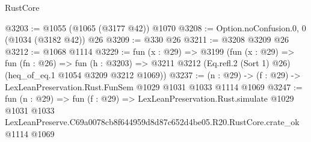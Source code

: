 \begin{lexlean}{RustCore}
\begin{coremodule}
@3203 := @1055 (@1065 (@3177 @42)) @1070
@3208 := Option.noConfusion.{0, 0} (@1034 (@3182 @42)) @26
@3209 := @330 @26
@3211 := @3208 @3209 @26
@3212 := @1068 @1114
@3229 := fun (x : @29) =>
  @3199
    (fun (x : @29) =>
    fun (fn : @26) =>
    fun (h : @3203) =>
    @3211 @3212 (Eq.refl.{2} (Sort 1) @26) (heq_of_eq.{1} @1054 @3209 @3212 @1069))
@3237 := (n : @29) -> (f : @29) -> LexLeanPreservation.Rust.FunSem @1029 @1031 @1033 @1114 @1069
@3247 := fun (n : @29) =>
  fun (f : @29) =>
  LexLeanPreservation.Rust.simulate
    @1029
    @1031
    @1033
    LexLeanPreserve.C69a0078cb8f644959d8d87c652d4be05.R20.RustCore.crate_ok
    @1114
    @1069
\end{coremodule}
\end{lexlean}
